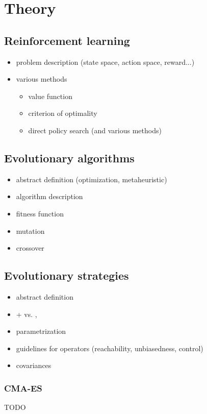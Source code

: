 \chapter{Theory}
\label{chap:theory}

\section{Reinforcement learning}
\label{sec:reinf}
\begin{itemize}
    \item problem description (state space, action space, reward...)
    \item various methods \begin{itemize}
        \item value function
        \item criterion of optimality
        \item direct policy search (and various methods)
    \end{itemize}
\end{itemize}
\section{Evolutionary algorithms}
\label{sec:ea}
\begin{itemize}
    \item abstract definition (optimization, metaheuristic)
    \item algorithm description
    \item fitness function
    \item mutation
    \item crossover
\end{itemize}
  \cite{Vikhar2016}
\section{Evolutionary strategies}
\label{sec:es}
\begin{itemize}
    \item abstract definition
    \item + vs. ,
    \item parametrization
    \item guidelines for operators (reachability, unbiasedness, control)
    \item covariances
\end{itemize}
     \cite{Rudolph2012}
\subsection{CMA-ES}
\label{subsec:cma-es}
TODO \cite{Hansen06}
